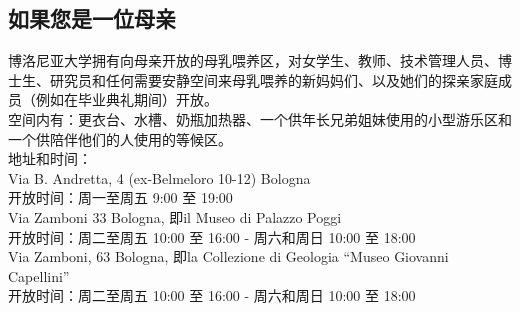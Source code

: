 \subsection{如果您是一位母亲}
博洛尼亚大学拥有向母亲开放的母乳喂养区，对女学生、教师、技术管理人员、博士生、研究员和任何需要安静空间来母乳喂养的新妈妈们、以及她们的探亲家庭成员（例如在毕业典礼期间）开放。\\
空间内有：更衣台、水槽、奶瓶加热器、一个供年长兄弟姐妹使用的小型游乐区和一个供陪伴他们的人使用的等候区。\\
地址和时间：\\
Via B. Andretta, 4 (ex-Belmeloro 10-12) Bologna\\
开放时间：周一至周五 9:00 至 19:00\\
Via Zamboni 33 Bologna, 即il Museo di Palazzo Poggi\\
开放时间：周二至周五 10:00 至 16:00 - 周六和周日 10:00 至 18:00\\
Via Zamboni, 63 Bologna, 即la Collezione di Geologia “Museo Giovanni Capellini”\\
开放时间：周二至周五 10:00 至 16:00 - 周六和周日 10:00 至 18:00\\








